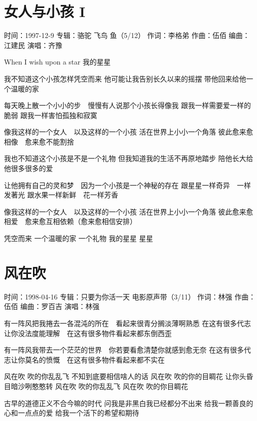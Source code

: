 \documentclass[UTF8,a4paper,oneside,twocolumn,12pt]{ctexbook}
\newcommand{\infopair}[2]{\textbullet #1：#2}
\newcommand{\zc}[1][伍佰]{\infopair{作词}{#1}}
\newcommand{\zq}[1][伍佰]{\infopair{作曲}{#1}}
\newcommand{\bq}[1][伍佰]{\infopair{编曲}{#1}}
\newcommand{\zj}[1]{\infopair{专辑}{#1}}
\newcommand{\sj}[1]{\infopair{时间}{#1}}
\newenvironment{info}{\begin{flushleft}\kaishu
	}
	{\end{flushleft}\normalsize\yahei\par}
\newenvironment{lyric}{
	}
{}
\begin{document}
\section{女人与小孩 I}
\begin{info}
	\sj{1997-12-9}
	\zj{骆驼 飞鸟 鱼（5/12）}
	\zc[李格弟]
	\zq
	\bq[江建民]
	\infopair{演唱}{齐豫}
\end{info}
\begin{lyric}
	When I wish upon a star
	我的星星

	我不知道这个小孩怎样凭空而来
	他可能让我告别长久以来的摇摆
	带他回来给他一个温暖的家

	每天晚上散一个小小的步　慢慢有人说那个小孩长得像我
	跟我一样需要爱一样的脆弱
	跟我一样害怕孤独和寂寞

	像我这样的一个女人　以及这样的一个小孩
	活在世界上小小一个角落
	彼此愈来愈相像　愈来愈不能割捨

	我也不知道这个小孩是不是一个礼物
	但我知道我的生活不再原地踏步
	陪他长大给他很多很多的爱

	让他拥有自己的灵和梦　因为一个小孩是一个神秘的存在
	跟星星一样奇异　一样发著光
	跟水果一样新鲜　花一样芳香

	像我这样的一个女人　以及这样的一个小孩
	活在世界上小小一个角落
	彼此愈来愈相爱　愈来愈互相依赖（愈来愈相信安排）

	凭空而来
	一个温暖的家
	一个礼物
	我的星星
	星星
\end{lyric}

\section{风在吹}
\begin{info}
	\sj{1998-04-16}
	\zj{只要为你活一天 电影原声带（3/11）}
	\zc[林强]
	\zq
	\bq[罗百吉]
	\infopair{演唱}{林强}
\end{info}
\begin{lyric}
	有一阵风把我捲去一各混沌的所在　看起来很青分搁淡薄啊熟悉
	在这有很多代志让你没法度能理解　在这有很多物件看起来都东倒西歪

	有一阵风我带去一个茫茫的世界　你若要看愈清楚你就感到愈无奈
	在这有很多代志让你莫名的愤慨　在这有很多物件看起来都不实在


	风在吹 吹的你乱乱飞 不知到底要相信啥人的话
	风在吹 吹的你的目睭花 让你头昏目暗沙咧憨憨转
	风在吹 吹的你乱乱飞
	风在吹 吹的你目睭花

	古早的道德正义不合今嘛的时代
	问我是非黑白我已经都分不出来
	给我一颗善良的心和一点点的爱
	给我一个活下的希望和期待
\end{lyric}
\end{document}
